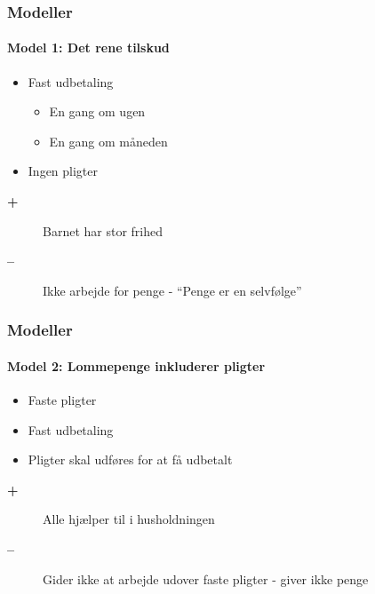 
\newcommand{\fordel}[1]{ %
\begin{description}\item[\color{ForestGreen}\textbf{+}]{#1}\end{description}
}

\newcommand{\ulempe}[1]{ %
\begin{description}\item[\color{red}\textbf{--}]{#1}\end{description}
}

\newcommand{\headercell}[1]{ %
\cellcolor{aauprimary}\color{white}\small\textbf{{#1}}
}

\begin{frame}
\frametitle{Modeller}
\framesubtitle{\textbf{Model 1:} Det rene tilskud} 
    \begin{itemize}
        \item{Fast udbetaling}
            \begin{itemize}
                \item{En gang om ugen}
                \item{En gang om måneden}
            \end{itemize}
        \item{Ingen pligter} 
    \end{itemize}
    \vspace{\baselineskip}
    \fordel{Barnet har stor frihed}
    \ulempe{Ikke arbejde for penge - ``Penge er en selvfølge''}
\end{frame}

\begin{frame}
\frametitle{Modeller}
\framesubtitle{\textbf{Model 2:} Lommepenge inkluderer pligter}
    \begin{itemize}
        \item{Faste pligter}
        \item{Fast udbetaling}
        \item{Pligter skal udføres for at få udbetalt}
    \end{itemize}
    \vspace{\baselineskip}
    \fordel{Alle hjælper til i husholdningen}
    \ulempe{Gider ikke at arbejde udover faste pligter - giver ikke penge}
\end{frame}

